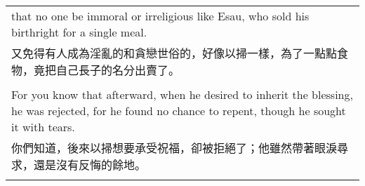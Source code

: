 \documentclass{book}
\begin{document}
\begin{tabularx}{\textwidth}{p{}}
that no one be immoral or irreligious like Esau, who sold his birthright for a single meal. \\
又免得有人成為淫亂的和貪戀世俗的，好像以掃一樣，為了一點點食物，竟把自己長子的名分出賣了。 \\ \\
For you know that afterward, when he desired to inherit the blessing, he was rejected, for he found no chance to repent, though he sought it with tears. \\
你們知道，後來以掃想要承受祝福，卻被拒絕了；他雖然帶著眼淚尋求，還是沒有反悔的餘地。 \\ \\

\hline
\end{tabularx}

\newpage
\end{document}
